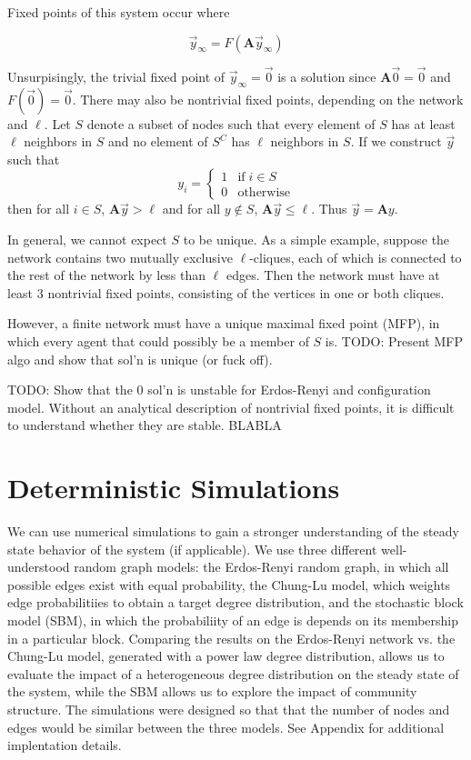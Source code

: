 \documentclass[12pt]{article}
\begin{document}
Fixed points of this system occur where

\begin{equation}
  \vec{y}_{\infty} = F(\mathbf{A}\vec{y}_{\infty})
\end{equation}

Unsurpisingly, the trivial fixed point of $\vec{y}_{\infty} = \vec{0}$ is a solution since $\mathbf{A}\vec{0} = \vec{0}$ and $F(\vec{0}) = \vec{0}$.  There may also be nontrivial fixed points, depending on the network and $\ell$.  Let $S$ denote a subset of nodes such that every element of $S$ has at least $\ell$ neighbors in $S$ and no element of $S^C$ has $\ell$ neighbors in $S$.  If we construct $\vec{y}$ such that  
\begin{equation}
  y_i = \begin{cases}
    1 &\text{if} \; i \in S \\
    0 &\text{otherwise}
  \end{cases}
\end{equation}
 then for all $i \in S$, $\mathbf{A}\vec{y} > \ell$ and for all $y \notin S$, $\mathbf{A}\vec{y} \leq \ell$.  Thus $\vec{y} = \mathbf{A}y$. 

In general, we cannot expect $S$ to be unique.  As a simple example, suppose the network contains two mutually exclusive $\ell$-cliques, each of which is connected to the rest of the network by less than $\ell$ edges.  Then the network must have at least 3 nontrivial fixed points, consisting of the vertices in one or both cliques.

However, a finite network must have a unique maximal fixed point (MFP), in which every agent that could possibly be a member of $S$ is.  
TODO: Present MFP algo and show that sol'n is unique (or fuck off). 

TODO: Show that the 0 sol'n is unstable for Erdos-Renyi and configuration model.  Without an analytical description of nontrivial fixed points, it is difficult to understand whether they are stable.  BLABLA  

\section{Deterministic Simulations}
We can use numerical simulations to gain a stronger understanding of the steady state behavior of the system (if applicable).  We use three different well-understood random graph models: the Erdos-Renyi random graph, in which all possible edges exist with equal probability, the Chung-Lu model, which weights edge probabilitiies to obtain a target degree distribution, and the stochastic block model (SBM), in which the probabiliity of an edge is depends on its membership in a particular block.  Comparing the results on the Erdos-Renyi network vs. the Chung-Lu model, generated with a power law degree distribution, allows us to evaluate the impact of a heterogeneous degree distribution on the steady state of the system, while the SBM allows us to explore the impact of community structure.  The simulations were designed so that that the number of nodes and edges would be similar between the three models.  See Appendix for additional implentation details.
\end{document}
